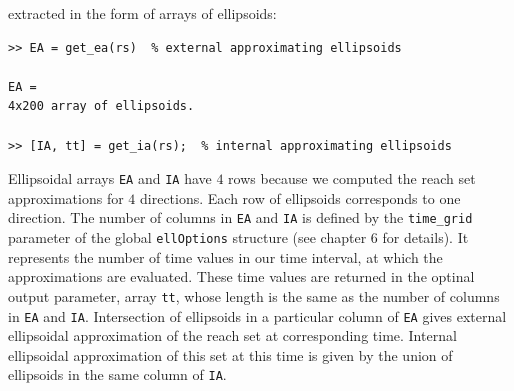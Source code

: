 \documentclass{report}
\begin{document}
extracted in the form of arrays of ellipsoids:
{\tt \begin{verbatim}
>> EA = get_ea(rs)  % external approximating ellipsoids

EA =
4x200 array of ellipsoids.

>> [IA, tt] = get_ia(rs);  % internal approximating ellipsoids
\end{verbatim} }
Ellipsoidal arrays {\tt EA} and {\tt IA} have $4$ rows because we computed
the reach set approximations for $4$ directions. Each row of ellipsoids
corresponds to one direction. The number of columns in {\tt EA} and {\tt IA}
is defined by the {\tt time\_grid} parameter of the global {\tt ellOptions}
structure (see chapter 6 for details). It represents the number of time values
in our time interval, at which the approximations are evaluated. These
time values are returned in the optinal output parameter, array {\tt tt},
whose length is the same as the number of columns in {\tt EA} and {\tt IA}.
Intersection of ellipsoids in a particular column of {\tt EA} gives
external ellipsoidal approximation of the reach set at corresponding time.
Internal ellipsoidal approximation of this set at this time is given by the
union of ellipsoids in the same column of {\tt IA}.
\end{document}
